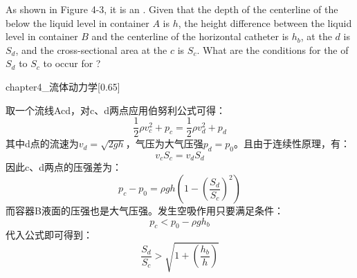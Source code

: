 \begin{solution}[流体动力学]
    As shown in Figure 4-3, it is an . Given that the depth of the centerline of the  below the liquid level in container $A$ is $h$,
    the height difference between the liquid level in container $B$ and the centerline of the horizontal catheter is $h_b$,  at the  $d$ is $S_d$,
    and the cross-sectional area at the  $c$ is $S_c$. What are the conditions for the  of $S_d$ to $S_c$ to occur for ?
    \begin{singlefigure}[流体动力学]{chapter4_流体动力学}[0.65]
    \end{singlefigure}

    \tcbrule

    取一个流线Acd，对c、d两点应用伯努利公式可得：
    \[\dfrac{1}{2}\rho v_c^2+p_c=\dfrac{1}{2}\rho v_d^2+p_d\]
    其中d点的流速为$v_d=\sqrt{2gh}$，气压为大气压强$p_d=p_0$。且由于连续性原理，有：
    \[v_c S_c=v_d S_d\]
    因此c、d两点的压强差为：
    \[p_c-p_0=\rho gh(1-(\dfrac{S_d}{S_c})^2)\]
    而容器B液面的压强也是大气压强。发生空吸作用只要满足条件：
    \[p_c<p_0-\rho gh_b\]
    代入公式即可得到：
    \[\dfrac{S_d}{S_c}>\sqrt{1+(\dfrac{h_b}{h})}\]
\end{solution}